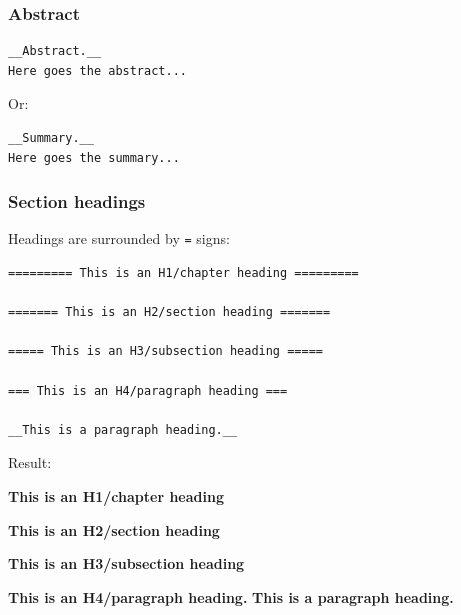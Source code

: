 \documentclass{beamer}
\begin{document}
\begin{frame}
\frametitle{Abstract}

\begin{Verbatim}[numbers=none,fontsize=\fontsize{9pt}{9pt},baselinestretch=0.95]
__Abstract.__
Here goes the abstract...
\end{Verbatim}

Or:
\begin{Verbatim}[numbers=none,fontsize=\fontsize{9pt}{9pt},baselinestretch=0.95]
__Summary.__
Here goes the summary...
\end{Verbatim}
\end{frame}

\begin{frame}
\frametitle{Section headings}

Headings are surrounded by \Verb!=! signs:
\begin{Verbatim}[numbers=none,fontsize=\fontsize{9pt}{9pt},baselinestretch=0.95]
========= This is an H1/chapter heading =========

======= This is an H2/section heading =======

===== This is an H3/subsection heading =====

=== This is an H4/paragraph heading ===

__This is a paragraph heading.__
\end{Verbatim}

Result:

\noindent\textbf{\huge This is an H1/chapter heading}

\noindent\textbf{\Large This is an H2/section heading}

\noindent\textbf{\large This is an H3/subsection heading}

\noindent\textbf{This is an H4/paragraph heading.}
\noindent\textbf{This is a paragraph heading.}
\end{frame}
\end{document}
